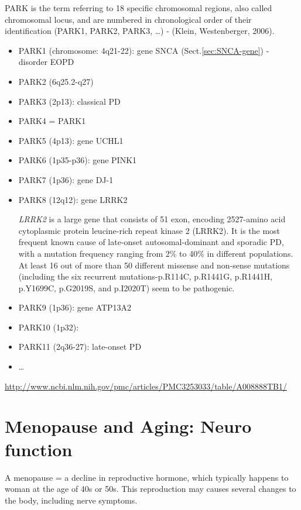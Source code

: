 PARK is the term referring to 18 specific chromosomal regions, also called
chromosomal locus, and are numbered in chronological order of their
identification (PARK1, PARK2, PARK3, \ldots) - (Klein, Westenberger, 2006). 
\begin{itemize}
  \item PARK1 (chromosome: 4q21-22): gene SNCA (Sect.\ref{sec:SNCA-gene}) -
  disorder EOPD
  
  \item PARK2 (6q25.2-q27)
  \item PARK3 (2p13): classical PD
  \item PARK4 = PARK1
  
  \item PARK5 (4p13): gene UCHL1
  \item PARK6 (1p35-p36): gene PINK1
  \item PARK7 (1p36): gene DJ-1
  \item PARK8 (12q12): gene LRRK2
  
{\it LRRK2} is a large gene that consists of 51 exon, encoding 2527-amino acid
cytoplasmic protein leucine-rich repeat kinase 2 (LRRK2). It is the most
frequent known cause of late-onset autosomal-dominant and sporadic PD, with a
mutation frequency ranging from 2\% to 40\% in different populations.
At least 16 out of more than 50 different missense and non-sense mutations
(including the six recurrent mutations-p.R114C, p.R1441G, p.R1441H, p.Y1699C,
p.G2019S, and p.I2020T) seem to be pathogenic.

  \item PARK9 (1p36): gene ATP13A2
  \item PARK10 (1p32): 
  \item PARK11 (2q36-27): late-onset PD
  
  \item \ldots
\end{itemize}
\url{http://www.ncbi.nlm.nih.gov/pmc/articles/PMC3253033/table/A008888TB1/}



\section{Menopause and Aging: Neuro function}
\label{sec:menopause-aging}

A menopause = a decline in reproductive hormone, which typically happens to
woman at the age of 40s or 50s. This reproduction may causes several changes to
the body, including nerve symptoms.

